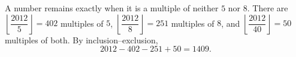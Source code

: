 A number remains exactly when it is a multiple of neither $5$ nor $8$. There are $\left\lfloor\dfrac{2012}{5}\right\rfloor=402$ multiples of $5$, $\left\lfloor\dfrac{2012}{8}\right\rfloor=251$ multiples of $8$, and $\left\lfloor\dfrac{2012}{40}\right\rfloor=50$ multiples of both. By inclusion--exclusion,
\[
2012-402-251+50=\boxed{1409}.
\]
